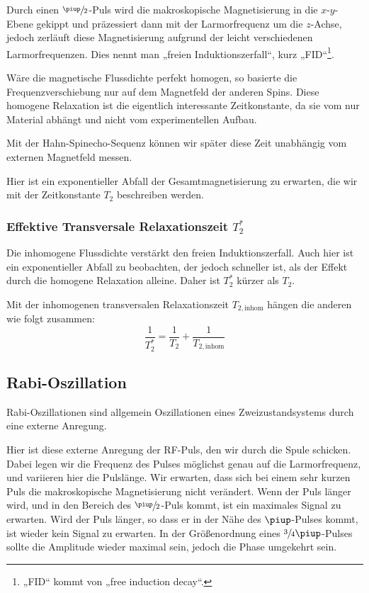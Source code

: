Durch einen $\sfrac\piup2$-Puls wird die makroskopische Magnetisierung in die
$x$-$y$-Ebene gekippt und präzessiert dann mit der Larmorfrequenz um die
$z$-Achse, jedoch zerläuft diese Magnetisierung aufgrund der leicht
verschiedenen Larmorfrequenzen. Dies nennt man „freien Induktionszerfall“, kurz
„FID“\footnote{„FID“ kommt von „free induction decay“.}.

Wäre die magnetische Flussdichte perfekt homogen, so basierte die
Frequenzverschiebung nur auf dem Magnetfeld der anderen Spins. Diese homogene
Relaxation ist die eigentlich interessante Zeitkonstante, da sie vom nur
Material abhängt und nicht vom experimentellen Aufbau.

Mit der Hahn-Spinecho-Sequenz können wir später diese Zeit unabhängig vom
externen Magnetfeld messen.

Hier ist ein exponentieller Abfall der Gesamtmagnetisierung zu erwarten, die
wir mit der Zeitkonstante $T_2$ beschreiben werden.

\subsubsection{Effektive Transversale Relaxationszeit $T_2^*$}

Die inhomogene Flussdichte verstärkt den freien Induktionszerfall. Auch hier
ist ein exponentieller Abfall zu beobachten, der jedoch schneller ist, als der
Effekt durch die homogene Relaxation alleine. Daher ist $T_2^*$ kürzer als
$T_2$.

Mit der inhomogenen transversalen Relaxationszeit $T_{2,\text{inhom}}$ hängen
die anderen wie folgt zusammen: \parencite[Formel~P443.5]{physik412-Anleitung}
\begin{equation}
    \label{eq:}
    \frac{1}{T_2^*} = \frac 1{T_2} + \frac{1}{T_{2,\text{inhom}}}
\end{equation}

\subsection{Rabi-Oszillation}

Rabi-Oszillationen sind allgemein Oszillationen eines Zweizustandsystems durch
eine externe Anregung. \parencite{wikipedia/Rabi_Oszillation}
\parencite[Abschnitt~15.9.5 „Rabi-Atomstrahlresonanz”]{meschede-gerthsen_24}

Hier ist diese externe Anregung der RF-Puls, den wir durch die Spule schicken.
Dabei legen wir die Frequenz des Pulses möglichst genau auf die Larmorfrequenz,
und variieren hier die Pulslänge. Wir erwarten, dass sich bei einem sehr kurzen
Puls die makroskopische Magnetisierung nicht verändert. Wenn der Puls länger
wird, und in den Bereich des $\sfrac\piup2$-Puls kommt, ist ein maximales
Signal zu erwarten. Wird der Puls länger, so dass er in der Nähe des
$\piup$-Pulses kommt, ist wieder kein Signal zu erwarten. In der Größenordnung
eines $\sfrac34\piup$-Pulses sollte die Amplitude wieder maximal sein, jedoch
die Phase umgekehrt sein.

